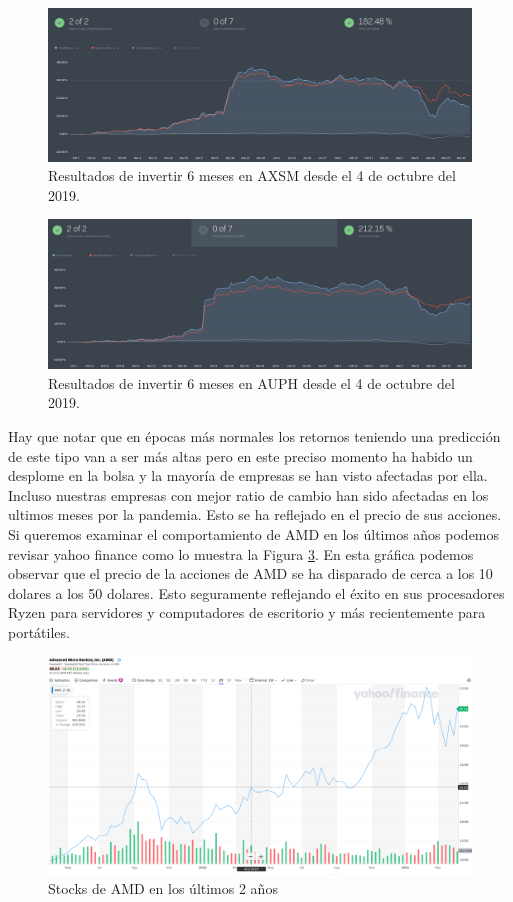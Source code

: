 \documentclass[10pt,a4paper,twocolumn]{article}
\begin{document}
	\begin{figure}
		\centering
		\includegraphics[width=1\linewidth]{AXSM}
		\caption{Resultados de invertir 6 meses en AXSM desde el 4 de octubre del 2019.}
		\label{fig:axsm}
	\end{figure}
	\begin{figure}
		\centering
		\includegraphics[width=1\linewidth]{auph}
		\caption{Resultados de invertir 6 meses en AUPH desde el 4 de octubre del 2019.}
		\label{fig:auph}
	\end{figure}
	Hay que notar que en épocas más normales los retornos teniendo una predicción de este tipo van a ser más altas pero en este preciso momento ha habido un desplome en la bolsa y la mayoría de empresas se han visto afectadas por ella. Incluso nuestras empresas con mejor ratio de cambio han sido afectadas en los ultimos meses por la pandemia. Esto se ha reflejado en el precio de sus acciones. \\

Si queremos examinar el comportamiento de AMD en los últimos años podemos revisar yahoo finance como lo muestra la Figura \ref{fig:amdstock}. En esta gráfica podemos observar que el precio de la acciones de AMD se ha disparado de cerca a los 10 dolares a los 50 dolares. Esto seguramente reflejando el éxito en sus procesadores Ryzen para servidores y computadores de escritorio y más recientemente para portátiles. \\


\begin{figure}
	\centering
	\includegraphics[width=1\linewidth]{amd_stock}
	\caption{Stocks de AMD en los últimos 2 años}
	\label{fig:amdstock}
\end{figure}

		
	
\end{document}
